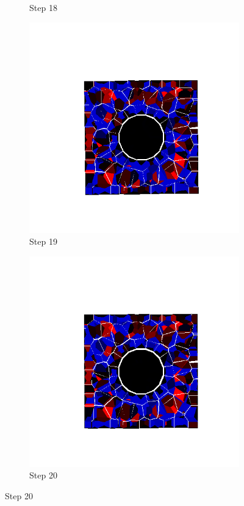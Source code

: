 \begin{figure}[ht!]
\begin{subfigure}{.25\textwidth}
      \caption{Step 18}
      \end{subfigure}%
      \begin{subfigure}{.25\textwidth}
        \centering
        \includegraphics[width=1.0\linewidth]{Files/Small_DEF/IS/DEP5-STEP(019).png}
      \caption{Step 19}
      \end{subfigure}%
      \begin{subfigure}{.25\textwidth}
        \centering
        \includegraphics[width=1.0\linewidth]{Files/Small_DEF/IS/DEP5-STEP(020).png}
      \caption{Step 20}
      \end{subfigure}


\end{figure}
